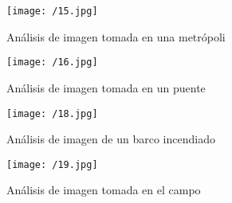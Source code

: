 \begin{figure}[!h]
\begin{center}
\texttt{[image: /15.jpg]}
\caption[Análisis de imagen tomada en una metrópoli]{Análisis de imagen tomada en una metrópoli}
\label{fig:imagen5}
\end{center}
\end{figure}

\begin{figure}[!h]
\begin{center}
\texttt{[image: /16.jpg]}
\caption[Análisis de imagen tomada en un puente]{Análisis de imagen tomada en un puente}
\label{fig:imagen6}
\end{center}
\end{figure}

\begin{figure}[!h]
\begin{center}
\texttt{[image: /18.jpg]}
\caption[Análisis de imagen de un barco incendiado]{Análisis de imagen de un barco incendiado}
\label{fig:imagen8}
\end{center}
\end{figure}

\begin{figure}[!h]
\begin{center}
\texttt{[image: /19.jpg]}
\caption[Análisis de imagen tomada en el campo]{Análisis de imagen tomada en el campo}
\label{fig:imagen9}
\end{center}
\end{figure}


